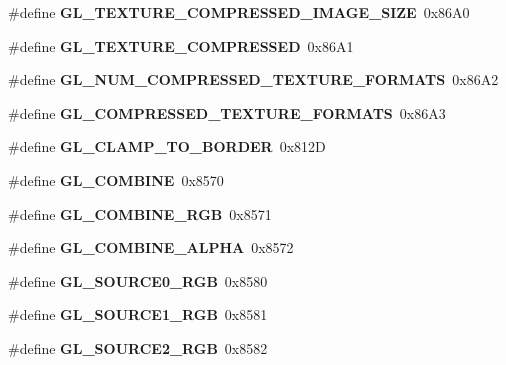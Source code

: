 \begin{DoxyCompactItemize}
\item 
\#define {\bfseries G\+L\+\_\+\+T\+E\+X\+T\+U\+R\+E\+\_\+\+C\+O\+M\+P\+R\+E\+S\+S\+E\+D\+\_\+\+I\+M\+A\+G\+E\+\_\+\+S\+I\+Z\+E}~0x86\+A0\label{_s_d_l__opengl_8h_ad70b42f24717cb3f3c3c494a7e45d488}

\item 
\#define {\bfseries G\+L\+\_\+\+T\+E\+X\+T\+U\+R\+E\+\_\+\+C\+O\+M\+P\+R\+E\+S\+S\+E\+D}~0x86\+A1\label{_s_d_l__opengl_8h_a72b1a842a461287f48c6e9601243bbee}

\item 
\#define {\bfseries G\+L\+\_\+\+N\+U\+M\+\_\+\+C\+O\+M\+P\+R\+E\+S\+S\+E\+D\+\_\+\+T\+E\+X\+T\+U\+R\+E\+\_\+\+F\+O\+R\+M\+A\+T\+S}~0x86\+A2\label{_s_d_l__opengl_8h_a88d44856e13232d3c0bec297fd38d627}

\item 
\#define {\bfseries G\+L\+\_\+\+C\+O\+M\+P\+R\+E\+S\+S\+E\+D\+\_\+\+T\+E\+X\+T\+U\+R\+E\+\_\+\+F\+O\+R\+M\+A\+T\+S}~0x86\+A3\label{_s_d_l__opengl_8h_a393084c570497e0e45cd3946c1a130b1}

\item 
\#define {\bfseries G\+L\+\_\+\+C\+L\+A\+M\+P\+\_\+\+T\+O\+\_\+\+B\+O\+R\+D\+E\+R}~0x812\+D\label{_s_d_l__opengl_8h_aa5d86f453ce19bef15e848d313c653e2}

\item 
\#define {\bfseries G\+L\+\_\+\+C\+O\+M\+B\+I\+N\+E}~0x8570\label{_s_d_l__opengl_8h_afa40fcd465207b4de60ccfddcc77248e}

\item 
\#define {\bfseries G\+L\+\_\+\+C\+O\+M\+B\+I\+N\+E\+\_\+\+R\+G\+B}~0x8571\label{_s_d_l__opengl_8h_ae89fd86422b8c78e1eac7c255b56ebce}

\item 
\#define {\bfseries G\+L\+\_\+\+C\+O\+M\+B\+I\+N\+E\+\_\+\+A\+L\+P\+H\+A}~0x8572\label{_s_d_l__opengl_8h_a9df51268efd1d3926d9cc3cd9bad25c1}

\item 
\#define {\bfseries G\+L\+\_\+\+S\+O\+U\+R\+C\+E0\+\_\+\+R\+G\+B}~0x8580\label{_s_d_l__opengl_8h_ae1fd330f86e60ac3438e8b1df3f7a7ba}

\item 
\#define {\bfseries G\+L\+\_\+\+S\+O\+U\+R\+C\+E1\+\_\+\+R\+G\+B}~0x8581\label{_s_d_l__opengl_8h_a6b7e9b816088b68a2f6549eec0bee1b7}

\item 
\#define {\bfseries G\+L\+\_\+\+S\+O\+U\+R\+C\+E2\+\_\+\+R\+G\+B}~0x8582\label{_s_d_l__opengl_8h_a3821b7f8c55b1dffbee97dfa2400003a}


\end{DoxyCompactItemize}
